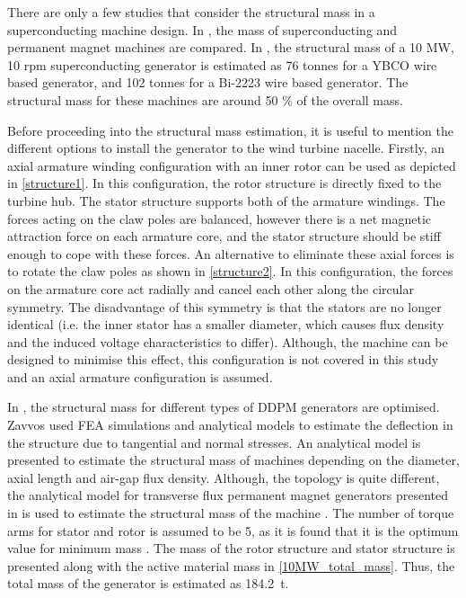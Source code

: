 \documentclass[final,peerreview,onecolumn]{IEEEtran}
\begin{document}
There are only a few studies that consider the structural mass in a superconducting machine design. In \cite{Maples2010}, the mass of superconducting and permanent magnet machines are compared. In \cite{Sung2013}, the structural mass of a 10 MW, 10 rpm superconducting generator is estimated as 76 tonnes for a YBCO wire based generator, and 102 tonnes for a Bi-2223 wire based generator. The structural mass for these machines are around 50 \% of the overall mass.

Before proceeding into the structural mass estimation, it is useful to mention the different options to install the generator to the wind turbine nacelle. Firstly, an axial armature winding configuration with an inner rotor can be used as depicted in \autoref{structure1}. In this configuration, the rotor structure is directly fixed to the turbine hub.  The stator structure supports both of the armature windings. The forces acting on the claw poles are balanced, however there is a net magnetic attraction force on each armature core, and the stator structure should be stiff enough to cope with these forces. An alternative to eliminate these axial forces is to rotate the claw poles as shown in \autoref{structure2}. In this configuration, the forces on the armature core act radially and cancel each other along the circular symmetry. The disadvantage of this symmetry is that the stators are no longer identical (i.e. the inner stator has a smaller diameter, which causes flux density and the induced voltage characteristics to differ). Although, the machine can be designed to minimise this effect, this configuration is not covered in this study and an axial armature configuration is assumed.


In \cite{Zavvos2013}, the structural mass for different types of DDPM generators are optimised. Zavvos used FEA simulations and analytical models to estimate the deflection in the structure due to tangential and normal stresses. An analytical model is presented to estimate the structural mass of machines depending on the diameter, axial length and air-gap flux density. Although, the topology is quite different, the analytical model for transverse flux permanent magnet generators presented in \cite{Zavvos2013} is used to estimate the structural mass of the machine . The number of torque arms for stator and rotor is assumed to be 5, as it is found that it is the optimum value for minimum mass \cite{Zavvos2013}. The mass of the rotor structure and stator structure is presented along with the active material mass in \autoref{10MW_total_mass}. Thus, the total mass of the generator is estimated as 184.2~t.
\end{document}
